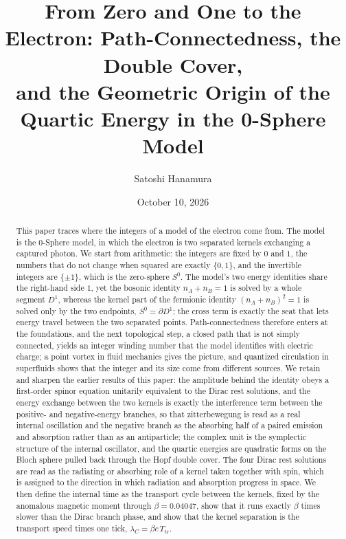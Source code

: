 \documentclass[%
 reprint, amsmath,amssymb, aps, prb, ]{revtex4-2}
\numberwithin{equation}{section}
\begin{document}
\title{From Zero and One to the Electron: Path-Connectedness, the Double Cover,\\ and the Geometric Origin of the Quartic Energy in the 0-Sphere Model}

\author{Satoshi Hanamura}

\date{October 10, 2026}

\begin{abstract}
This paper traces where the integers of a model of the electron come from. The model is the 0-Sphere model, in which the electron is two separated kernels exchanging a captured photon.
We start from arithmetic: the integers are fixed by $0$ and $1$, the numbers that do not change when squared are exactly $\{0,1\}$, and the invertible integers are $\{\pm1\}$, which is the zero-sphere $S^0$.
The model's two energy identities share the right-hand side $1$, yet the bosonic identity $n_A+n_B=1$ is solved by a whole segment $D^1$, whereas the kernel part of the fermionic identity $(n_A+n_B)^2=1$ is solved only by the two endpoints, $S^0=\partial D^1$; the cross term is exactly the seat that lets energy travel between the two separated points.
Path-connectedness therefore enters at the foundations, and the next topological step, a closed path that is not simply connected, yields an integer winding number that the model identifies with electric charge; a point vortex in fluid mechanics gives the picture, and quantized circulation in superfluids shows that the integer and its size come from different sources.
We retain and sharpen the earlier results of this paper: the amplitude behind the identity obeys a first-order spinor equation unitarily equivalent to the Dirac rest solutions, and the energy exchange between the two kernels is exactly the interference term between the positive- and negative-energy branches, so that zitterbewegung is read as a real internal oscillation and the negative branch as the absorbing half of a paired emission and absorption rather than as an antiparticle; the complex unit is the symplectic structure of the internal oscillator, and the quartic energies are quadratic forms on the Bloch sphere pulled back through the Hopf double cover. The four Dirac rest solutions are read as the radiating or absorbing role of a kernel taken together with spin, which is assigned to the direction in which radiation and absorption progress in space.
We then define the internal time as the transport cycle between the kernels, fixed by the anomalous magnetic moment through $\beta=0.04047$, show that it runs exactly $\beta$ times slower than the Dirac branch phase, and show that the kernel separation is the transport speed times one tick, $\lambda_C=\beta c\,T_{\mathrm{tr}}$.

\end{abstract}
\end{document}
